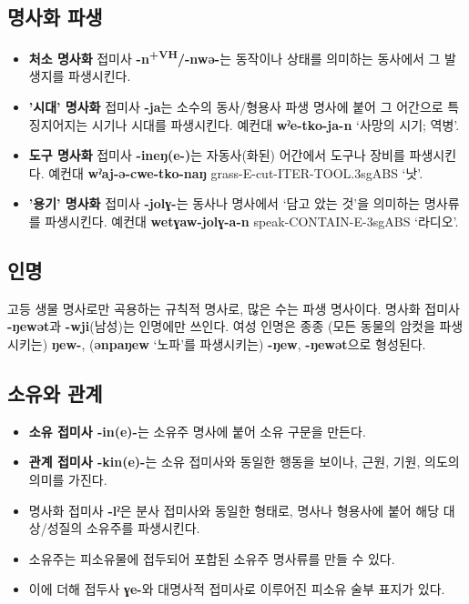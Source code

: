 \subsection{명사화 파생}
\begin{itemize}
	\item \textbf{처소 명사화} 접미사 \textbf{-n\textsuperscript{+VH}/-nwə-}는 동작이나 상태를 의미하는 동사에서 그 발생지를 파생시킨다.
	\item \textbf{'시대' 명사화} 접미사 \textbf{-ja}는 소수의 동사/형용사 파생 명사에 붙어 그 어간으로 특징지어지는 시기나 시대를 파생시킨다. 예컨대 \textbf{wˀe-tko-ja-n} `사망의 시기; 역병'. 
	\item \textbf{도구 명사화} 접미사 \textbf{-ineŋ(e-)}는 자동사(화된) 어간에서 도구나 장비를 파생시킨다. 예컨대 \textbf{wˀaj-ə-cwe-tko-naŋ} grass-E-cut-ITER-TOOL.3sgABS `낫'.
	\item \textbf{'용기' 명사화} 접미사 \textbf{-jolɣ-}는 동사나 명사에서 `담고 았는 것'을 의미하는 명사류를 파생시킨다. 예컨대 \textbf{wetɣaw-jolɣ-a-n} speak-CONTAIN-E-3sgABS `라디오'.
\end{itemize}
\subsection{인명}
고등 생물 명사로만 곡용하는 규칙적 명사로, 많은 수는 파생 명사이다. 명사화 접미사 \textbf{-ŋewət}과 \textbf{-wji}(남성)는 인명에만 쓰인다. 여성 인명은 종종 (모든 동물의 암컷을 파생시키는) \textbf{ŋew-}, (\textbf{ənpaŋew} `노파'를 파생시키는) \textbf{-ŋew}, \textbf{-ŋewət}으로 형성된다.
\subsection{소유와 관계}
\begin{itemize}
	\item \textbf{소유 접미사 -in(e)-}는 소유주 명사에 붙어 소유 구문을 만든다.
	\item \textbf{관계 접미사 -kin(e)-}는 소유 접미사와 동일한 행동을 보이나, 근원, 기원, 의도의 의미를 가진다.
	\item 명사화 접미사 \textbf{-lˀ}은 분사 접미사와 동일한 형태로, 명사나 형용사에 붙어 해당 대상/성질의 소유주를 파생시킨다.
	\item 소유주는 피소유물에 접두되어 포합된 소유주 명사류를 만들 수 있다.
	\item 이에 더해 접두사 \textbf{ɣe-}와 대명사적 접미사로 이루어진 피소유 술부 표지가 있다.
\end{itemize}
